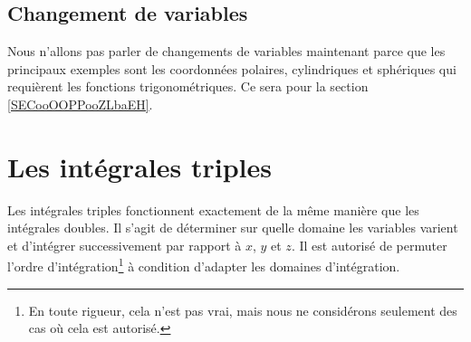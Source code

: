 \subsection{Changement de variables}

Nous n'allons pas parler de changements de variables maintenant parce que les principaux exemples sont les coordonnées polaires, cylindriques et sphériques qui requièrent les fonctions trigonométriques. Ce sera pour la section \ref{SECooOOPPooZLbaEH}.

\section{Les intégrales triples}

Les intégrales triples fonctionnent exactement de la même manière que les intégrales doubles. Il s'agit de déterminer sur quelle domaine les variables varient et d'intégrer successivement par rapport à \( x\), \( y\) et \( z\). Il est autorisé de permuter l'ordre d'intégration\footnote{En toute rigueur, cela n'est pas vrai, mais nous ne considérons seulement des cas où cela est autorisé.} à condition d'adapter les domaines d'intégration.

